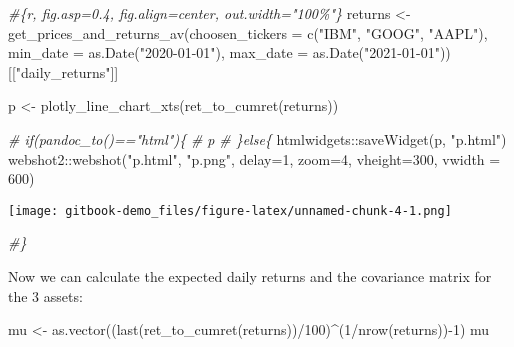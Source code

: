 \documentclass[
  oneside]{book}
\newenvironment{Shaded}{\begin{snugshade}}{\end{snugshade}}
\newcommand{\AttributeTok}[1]{\textcolor[rgb]{0.77,0.63,0.00}{#1}}
\newcommand{\CommentTok}[1]{\textcolor[rgb]{0.56,0.35,0.01}{\textit{#1}}}
\newcommand{\DecValTok}[1]{\textcolor[rgb]{0.00,0.00,0.81}{#1}}
\newcommand{\FunctionTok}[1]{\textcolor[rgb]{0.00,0.00,0.00}{#1}}
\newcommand{\NormalTok}[1]{#1}
\newcommand{\OtherTok}[1]{\textcolor[rgb]{0.56,0.35,0.01}{#1}}
\newcommand{\SpecialCharTok}[1]{\textcolor[rgb]{0.00,0.00,0.00}{#1}}
\newcommand{\StringTok}[1]{\textcolor[rgb]{0.31,0.60,0.02}{#1}}
\begin{document}
\begin{Shaded}
\begin{Highlighting}[]
\CommentTok{\#\textasciigrave{}\textasciigrave{}\textasciigrave{}\{r, fig.asp=0.4, fig.align=\textquotesingle{}center\textquotesingle{}, out.width="100\%"\}}
\NormalTok{returns }\OtherTok{\textless{}{-}} \FunctionTok{get\_prices\_and\_returns\_av}\NormalTok{(}\AttributeTok{choosen\_tickers =} \FunctionTok{c}\NormalTok{(}\StringTok{"IBM"}\NormalTok{, }\StringTok{"GOOG"}\NormalTok{, }\StringTok{"AAPL"}\NormalTok{), }\AttributeTok{min\_date =} \FunctionTok{as.Date}\NormalTok{(}\StringTok{"2020{-}01{-}01"}\NormalTok{), }\AttributeTok{max\_date =} \FunctionTok{as.Date}\NormalTok{(}\StringTok{"2021{-}01{-}01"}\NormalTok{))[[}\StringTok{"daily\_returns"}\NormalTok{]]}

\NormalTok{p }\OtherTok{\textless{}{-}} \FunctionTok{plotly\_line\_chart\_xts}\NormalTok{(}\FunctionTok{ret\_to\_cumret}\NormalTok{(returns))}

\CommentTok{\# if(pandoc\_to()=="html")\{}
\CommentTok{\#   p}
\CommentTok{\# \}else\{}
\NormalTok{htmlwidgets}\SpecialCharTok{::}\FunctionTok{saveWidget}\NormalTok{(p, }\StringTok{"p.html"}\NormalTok{)}
\NormalTok{webshot2}\SpecialCharTok{::}\FunctionTok{webshot}\NormalTok{(}\StringTok{"p.html"}\NormalTok{, }\StringTok{"p.png"}\NormalTok{, }\AttributeTok{delay=}\DecValTok{1}\NormalTok{, }\AttributeTok{zoom=}\DecValTok{4}\NormalTok{, }\AttributeTok{vheight=}\DecValTok{300}\NormalTok{, }\AttributeTok{vwidth =} \DecValTok{600}\NormalTok{)}
\end{Highlighting}
\end{Shaded}

\texttt{[image: gitbook-demo\_files/figure-latex/unnamed-chunk-4-1.png]}

\begin{Shaded}
\begin{Highlighting}[]
\CommentTok{\#\}}
\end{Highlighting}
\end{Shaded}

Now we can calculate the expected daily returns and the covariance matrix for the 3 assets:

\begin{Shaded}
\begin{Highlighting}[]
\NormalTok{mu }\OtherTok{\textless{}{-}} \FunctionTok{as.vector}\NormalTok{((}\FunctionTok{last}\NormalTok{(}\FunctionTok{ret\_to\_cumret}\NormalTok{(returns))}\SpecialCharTok{/}\DecValTok{100}\NormalTok{)}\SpecialCharTok{\^{}}\NormalTok{(}\DecValTok{1}\SpecialCharTok{/}\FunctionTok{nrow}\NormalTok{(returns))}\SpecialCharTok{{-}}\DecValTok{1}\NormalTok{)}
\NormalTok{mu}
\end{Highlighting}
\end{Shaded}
\end{document}
